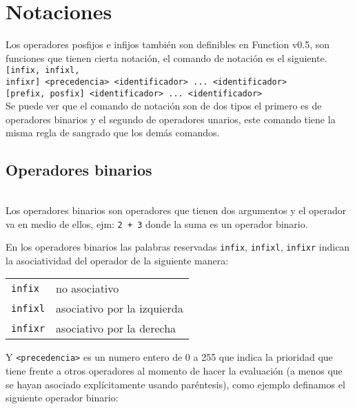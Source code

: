    \section{Notaciones}
      Los operadores posfijos e infijos también son definibles en Function v0.5, son funciones que tienen cierta notación, el comando de notación es el siguiente.
      \\
      
      \texttt{[infix, infixl, infixr]~<precedencia>~<identificador>~...~<identificador>}\\
      \texttt{[prefix, posfix]~<identificador>~...~<identificador>}
      \\
      
      Se puede ver que el comando de notación son de dos tipos el primero es de operadores binarios y el segundo de operadores unarios, este comando tiene la misma regla de sangrado que los demás comandos.
      
      \subsection*{Operadores binarios}\texttt{~}\\
      
      Los operadores binarios son operadores que tienen dos argumentos y el operador va en medio de ellos, ejm: \texttt{2 + 3} donde la suma es un operador binario.
      
      En los operadores binarios las palabras reservadas \texttt{infix}, \texttt{infixl}, \texttt{infixr} indican la asociatividad del operador de la siguiente manera:
      
      \begin{longtable}[x]{ll}
         \texttt{infix } & no asociativo\\
         \texttt{infixl} & asociativo por la izquierda\\
         \texttt{infixr} & asociativo por la derecha\\
      \end{longtable}
      
      Y \texttt{<precedencia>} es un numero entero de 0 a 255 que indica la prioridad que tiene frente a otros operadores al momento de hacer la evaluación (a menos que se hayan asociado explícitamente usando paréntesis), como ejemplo definamos el siguiente operador binario:
      
      \begin{fxcode}
         \\
         \\
         \\
      \end{fxcode}
      
